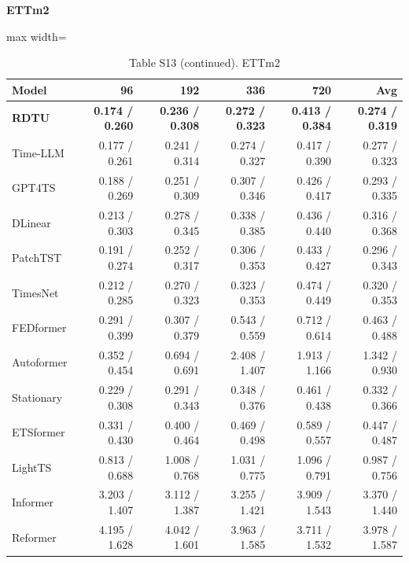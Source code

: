 \begin{table}[H]\centering\small
\caption*{Table S13 (continued). ETTm2}
\textbf{ETTm2}\par\smallskip
\begin{adjustbox}{max width=\linewidth}\begin{tabular}{lrrrrr}\toprule
\textbf{Model} & \textbf{96} & \textbf{192} & \textbf{336} & \textbf{720} & \textbf{Avg}\\\midrule
\rowcolor{blue!5}
\textbf{RDTU} & \textbf{0.174 / 0.260} & \textbf{0.236 / 0.308} & \textbf{0.272 / 0.323} & \textbf{0.413 / 0.384} & \textbf{0.274 / 0.319}\\
Time-LLM & 0.177 / 0.261 & 0.241 / 0.314 & 0.274 / 0.327 & 0.417 / 0.390 & 0.277 / 0.323\\
GPT4TS & 0.188 / 0.269 & 0.251 / 0.309 & 0.307 / 0.346 & 0.426 / 0.417 & 0.293 / 0.335\\
DLinear & 0.213 / 0.303 & 0.278 / 0.345 & 0.338 / 0.385 & 0.436 / 0.440 & 0.316 / 0.368\\
PatchTST & 0.191 / 0.274 & 0.252 / 0.317 & 0.306 / 0.353 & 0.433 / 0.427 & 0.296 / 0.343\\
TimesNet & 0.212 / 0.285 & 0.270 / 0.323 & 0.323 / 0.353 & 0.474 / 0.449 & 0.320 / 0.353\\
FEDformer & 0.291 / 0.399 & 0.307 / 0.379 & 0.543 / 0.559 & 0.712 / 0.614 & 0.463 / 0.488\\
Autoformer & 0.352 / 0.454 & 0.694 / 0.691 & 2.408 / 1.407 & 1.913 / 1.166 & 1.342 / 0.930\\
Stationary & 0.229 / 0.308 & 0.291 / 0.343 & 0.348 / 0.376 & 0.461 / 0.438 & 0.332 / 0.366\\
ETSformer & 0.331 / 0.430 & 0.400 / 0.464 & 0.469 / 0.498 & 0.589 / 0.557 & 0.447 / 0.487\\
LightTS & 0.813 / 0.688 & 1.008 / 0.768 & 1.031 / 0.775 & 1.096 / 0.791 & 0.987 / 0.756\\
Informer & 3.203 / 1.407 & 3.112 / 1.387 & 3.255 / 1.421 & 3.909 / 1.543 & 3.370 / 1.440\\
Reformer & 4.195 / 1.628 & 4.042 / 1.601 & 3.963 / 1.585 & 3.711 / 1.532 & 3.978 / 1.587\\
\bottomrule\end{tabular}\end{adjustbox}\end{table}
